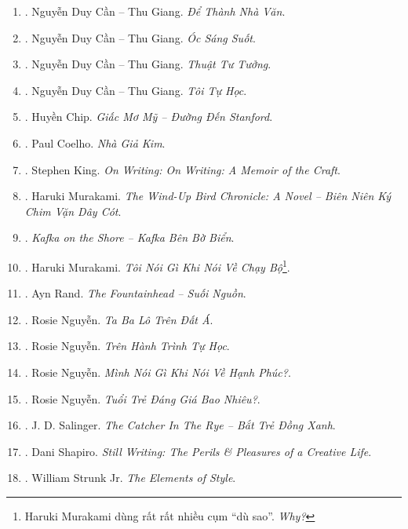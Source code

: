 \documentclass{article}
\begin{document}
\begin{enumerate}
	\item \cite{Can_dtnv}. Nguyễn Duy Cần -- Thu Giang. \textit{Để Thành Nhà Văn}.\hfill{\sf[done]}
	\item \cite{Can_oss}. Nguyễn Duy Cần -- Thu Giang. \textit{Óc Sáng Suốt}.\hfill{\sf[reading]}
	\item \cite{Can_ttt}. Nguyễn Duy Cần -- Thu Giang. \textit{Thuật Tư Tưởng}.\hfill{\sf[reading]}
	\item \cite{Can_tth}. Nguyễn Duy Cần -- Thu Giang. \textit{Tôi Tự Học}.\hfill{\sf[reading]}
	\item \cite{Chip2018}. Huyền Chip. \textit{Giấc Mơ Mỹ -- Đường Đến Stanford}.\hfill{\sf[done]}
	\item \cite{Coelho2023}. Paul Coelho. \textit{Nhà Giả Kim}.\hfill{\sf[done]}
	\item \cite{King2000, King2010}. Stephen King. \textit{On Writing: On Writing: A Memoir of the Craft}.\hfill{\sf[done]}
	\item \cite{Murakami_bird}. Haruki Murakami. \textit{The Wind-Up Bird Chronicle: A Novel -- Biên Niên Ký Chim Vặn Dây Cót}.\hfill{\sf[done]}
	\item \cite{Murakami_Kafka}. \textit{Kafka on the Shore -- Kafka Bên Bờ Biển}.\hfill{\sf[done]}
	\item \cite{Murakami_run}. Haruki Murakami. \textit{Tôi Nói Gì Khi Nói Về Chạy Bộ}\footnote{Haruki Murakami dùng rất rất nhiều cụm ``dù sao''. \textit{Why?}}.\hfill{\sf[done]}
	\item \cite{Rand_fountainhead}. Ayn Rand. \textit{The Fountainhead -- Suối Nguồn}.\hfill{\sf[done]}
	\item \cite{Rosie2021a}. Rosie Nguyễn. \textit{Ta Ba Lô Trên Đất Á}.\hfill{\sf[done]}
	\item \cite{Rosie2021b}. Rosie Nguyễn. \textit{Trên Hành Trình Tự Học}.\hfill{\sf[done]}
	\item \cite{Rosie2022a}. Rosie Nguyễn. \textit{Mình Nói Gì Khi Nói Về Hạnh Phúc?}.\hfill{\sf[done]}
	\item \cite{Rosie2022b}. Rosie Nguyễn. \textit{Tuổi Trẻ Đáng Giá Bao Nhiêu?}.\hfill{\sf[done]}
	\item \cite{Salinger_btdx}. J. D. Salinger. \textit{The Catcher In The Rye -- Bắt Trẻ Đồng Xanh}.\hfill{\sf[done]}
	\item \cite{Shapiro2014}. Dani Shapiro. \textit{Still Writing: The Perils \& Pleasures of a Creative Life}.\hfill{\sf[reading]}
	\item \cite{Strunk1918}. William Strunk Jr. \textit{The Elements of Style}.\hfill{\sf[done]}

\end{enumerate}
\end{document}
